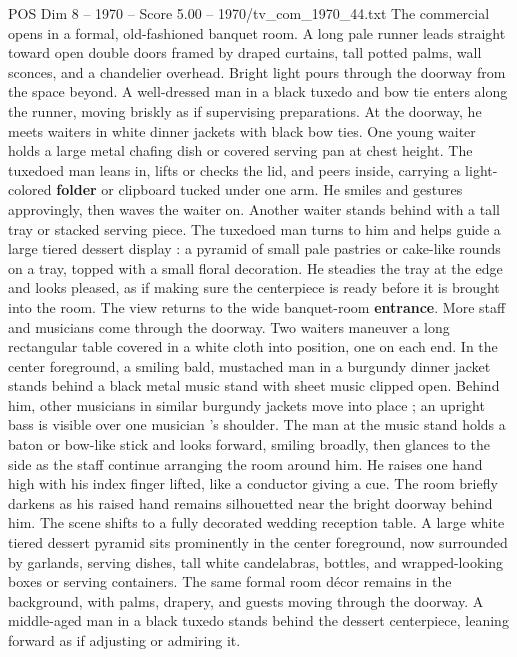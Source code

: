 \begin{textsample}{POS Dim 8 – 1970 – Score 5.00 – 1970/tv\_com\_1970\_44.txt}  \label{ex:f8_pos_040}
The commercial opens in a formal, old-fashioned banquet room.
A long pale runner leads straight toward open double doors framed by draped curtains, tall potted palms, wall sconces, and a chandelier overhead.
Bright light pours through the doorway from the space beyond.
A well-dressed man in a black tuxedo and bow tie enters along the runner, moving briskly as if supervising preparations.
At the doorway, he meets waiters in white dinner jackets with black bow ties.
One young waiter holds a large metal chafing dish or covered serving pan at chest height.
The tuxedoed man leans in, lifts or checks the lid, and peers inside, carrying a light-colored \textbf{folder} or clipboard tucked under one arm.
He smiles and gestures approvingly, then waves the waiter on.
Another waiter stands behind with a tall tray or stacked serving piece.
The tuxedoed man turns to him and helps guide a large tiered dessert display : a pyramid of small pale pastries or cake-like rounds on a tray, topped with a small floral decoration.
He steadies the tray at the edge and looks pleased, as if making sure the centerpiece is ready before it is brought into the room.
The view returns to the wide banquet-room \textbf{entrance}.
More staff and musicians come through the doorway.
Two waiters maneuver a long rectangular table covered in a white cloth into position, one on each end.
In the center foreground, a smiling bald, mustached man in a burgundy dinner jacket stands behind a black metal music stand with sheet music clipped open.
Behind him, other musicians in similar burgundy jackets move into place ; an upright bass is visible over one musician ’s shoulder.
The man at the music stand holds a baton or bow-like stick and looks forward, smiling broadly, then glances to the side as the staff continue arranging the room around him.
He raises one hand high with his index finger lifted, like a conductor giving a cue.
The room briefly darkens as his raised hand remains silhouetted near the bright doorway behind him.
The scene shifts to a fully decorated wedding reception table.
A large white tiered dessert pyramid sits prominently in the center foreground, now surrounded by garlands, serving dishes, tall white candelabras, bottles, and wrapped-looking boxes or serving containers.
The same formal room décor remains in the background, with palms, drapery, and guests moving through the doorway.
A middle-aged man in a black tuxedo stands behind the dessert centerpiece, leaning forward as if adjusting or admiring it.

\end{textsample}
